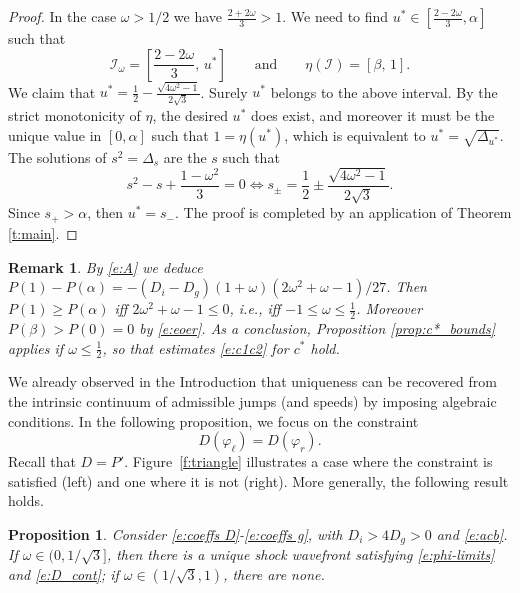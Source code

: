 \documentclass[11pt,a4paper]{article}
\newtheorem{proposition}{Proposition}[section]
\newtheorem{remark}{Remark}[section]
\begin{document}
\begin{proof}
In the case $\omega > 1/2$ we have $\frac{2+2\omega}{3}>1$. We need to find $u^* \in\left[\frac{2-2\omega}{3}, \alpha\right]$ such that
\[
\mathcal I_\omega = \left[\frac{2-2\omega}{3},\, u^*\right]
\qquad \text{and} \qquad
\eta(\mathcal I) = \left[\beta,\, 1\right].
\]
%
We claim that $u^*=\frac12-\frac{\sqrt{4\omega^2-1}}{2\sqrt{3}}$. Surely $u^*$ belongs to the above interval. By the strict monotonicity of $\eta$, the desired $u^*$ does exist, and moreover it must be the unique value in $[0,\alpha]$ such that
$1=\eta(u^*)$, which is equivalent to $u^* =\sqrt{\Delta_{u^*}}$.
The solutions of $s^2=\Delta_s$ are the $s$ such that
\[
s^2-s+\frac{1-\omega^2}{3}=0 \iff s_\pm
=\frac12\pm \frac{\sqrt{4\omega^2-1}}{2\sqrt{3}}.
\]
Since $s_+ > \alpha$, then $u^*=s_-$. The proof is completed by an application of Theorem \ref{t:main}.
\end{proof}

\begin{remark}\label{r:P1alpha}
{
\rm
By \eqref{e:A} we deduce
$
P(1)-P(\alpha)
=-(D_i-D_g)(1+\omega)\left(2\omega^2+\omega-1\right)/27$.
Then $P(1)\ge P(\alpha)$ iff $2\omega^2+\omega-1\le0$, i.e., iff $-1\le\omega\le\frac12$. 
Moreover $P(\beta)>P(0)=0$ by \eqref{e:eoer}. As a conclusion, Proposition \ref{prop:c*_bounds} applies if $\omega\le\frac12$, so that estimates \eqref{e:c1c2} for $c^*$ hold.
}
\end{remark}

We already observed in the Introduction that uniqueness can be recovered from the intrinsic continuum of admissible jumps (and speeds) by imposing algebraic conditions. In the following proposition, we focus on the constraint
\begin{equation}
\label{e:D_cont}
D(\varphi_\ell)=D(\varphi_r).
\end{equation}
Recall that $D=P'$. Figure~\ref{f:triangle} illustrates a case where the constraint is satisfied (left) and one where it is not (right). More generally, the following result holds.
\begin{proposition}\label{p:emm}
Consider \eqref{e:coeffs D}-\eqref{e:coeffs g}, with $D_i>4D_g>0$ and \eqref{e:acb}. If $\omega \in (0, 1/\sqrt{3}]$, then there is a unique shock wavefront satisfying \eqref{e:phi-limits}  and \eqref{e:D_cont}; if $\omega \in (1/\sqrt{3},1)$, there are none.

\end{proposition}
\end{document}
